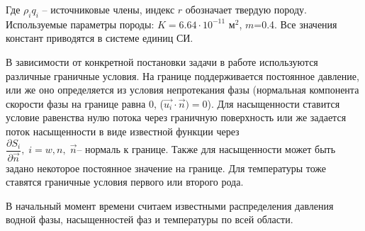 Где $\rho_i q_i$ -- источниковые члены, индекс $r$ обозначает твердую породу.
Используемые параметры породы: $K=6.64\cdot 10^{-11}$ м$^2$, $m$=0.4.
Все значения констант приводятся в системе единиц СИ.

В зависимости от конкретной постановки задачи в работе используются различные
граничные условия. На границе поддерживается постоянное давление, или же оно
определяется из условия непротекания фазы (нормальная компонента скорости
фазы на границе равна 0, ($\overrightarrow{u_i} \cdot \overrightarrow{n}) = 0$).
Для насыщенности ставится условие равенства нулю потока через граничную 
поверхность или же задается поток насыщенности в виде известной функции через 
$ \dfrac{\partial S_i}{\partial \overrightarrow{n}}, \; i=w,n, \; \overrightarrow{n} \text{-- нормаль к границе} $.
Также для насыщенности может быть задано некоторое постоянное значение на границе.
Для температуры тоже ставятся граничные условия первого или второго рода. 

В начальный момент времени считаем известными распределения давления водной 
фазы, насыщенностей фаз и температуры по всей области.
